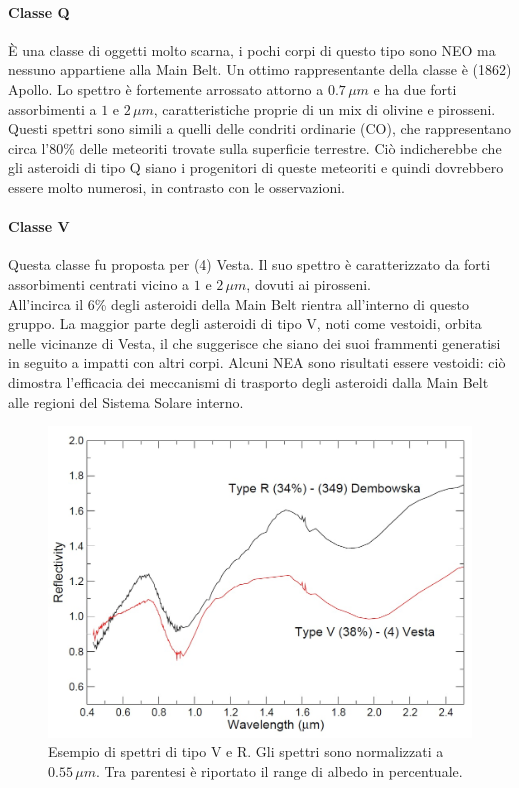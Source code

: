 \documentclass[a4paper,11pt,openright]{book}
\begin{document}
\paragraph*{Classe Q}
È una classe di oggetti molto scarna, i pochi corpi di questo tipo sono NEO ma nessuno appartiene alla Main Belt. Un ottimo rappresentante della classe è (1862) Apollo. Lo spettro è fortemente arrossato attorno a $0.7\,\mu m$ e ha due forti assorbimenti a $1$ e $2\,\mu m$, caratteristiche proprie di un mix di olivine e pirosseni.\\
Questi spettri sono simili a quelli delle condriti ordinarie (CO), che rappresentano circa l'80\% delle meteoriti trovate sulla superficie terrestre. Ciò indicherebbe che gli asteroidi di tipo Q siano i progenitori di queste meteoriti e quindi dovrebbero essere molto numerosi, in contrasto con le osservazioni.

\paragraph*{Classe V}
Questa classe fu proposta per (4) Vesta. Il suo spettro è caratterizzato da forti assorbimenti centrati vicino a $1$ e $2\,\mu m$, dovuti ai pirosseni.\\
All'incirca il 6\% degli asteroidi della Main Belt rientra all'interno di questo gruppo. La maggior parte degli asteroidi di tipo V, noti come vestoidi, orbita nelle vicinanze di Vesta, il che suggerisce che siano dei suoi frammenti generatisi in seguito a impatti con altri corpi. Alcuni NEA sono risultati essere vestoidi: ciò dimostra l'efficacia dei meccanismi di trasporto degli asteroidi dalla Main Belt alle regioni del Sistema Solare interno.

\begin{figure}
    \centering
    \includegraphics[scale=0.3]{figure/spettro_rv.jpg}
    \caption[Esempio di spettri di tipo V e R.]{Esempio di spettri di tipo V e R. Gli spettri sono normalizzati a $0.55\,\mu m$. Tra parentesi è riportato il range di albedo in percentuale. \citep{magrin_spectroscopic_nodate}}
    \label{spettro_rv}
\end{figure}
\end{document}
